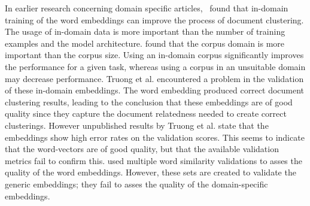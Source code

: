 \documentclass[../../Thesis.tex]{subfiles}
\begin{document}
In earlier research concerning domain specific articles,~\citet{Truong2017Thesis} found that in-domain training of the word embeddings can improve the process of document clustering. The usage of in-domain data is more important than the number of training examples and the model architecture. \citet{lai2016generate} found that the corpus domain is more important than the corpus size. Using an in-domain corpus significantly improves the performance for a given task, whereas using a corpus in an unsuitable domain may decrease performance.
Truong et al. encountered a problem in the validation of these in-domain embeddings. The word embedding produced correct document clustering results, leading to the conclusion that these embeddings are of good quality since they capture the document relatedness needed to create correct clusterings. However unpublished results by Truong et al. state that the embeddings show high error rates on the validation scores. This seems to indicate that the word-vectors are of good quality, but that the available validation metrics fail to confirm this. \citet{Truong2017Thesis} used multiple word similarity validations to asses the quality of the word embeddings. However, these sets are created to validate the generic embeddings; they fail to asses the quality of the domain-specific embeddings.
\end{document}
